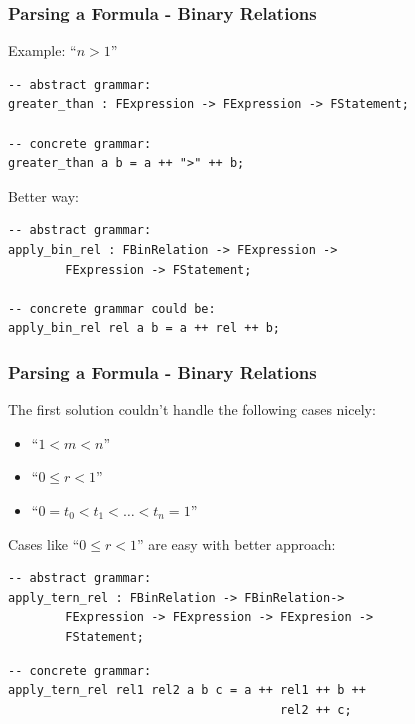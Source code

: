 \documentclass[usenames,dvipsnames,handout]{beamer}
\def\strf#1{``\emph{#1}''}   %
\begin{document}

\begin{frame}[fragile]
    \frametitle{Parsing a Formula - Binary Relations}
    Example: \strf{$n > 1$}

    \begin{lstlisting}[language=GF]
-- abstract grammar:
greater_than : FExpression -> FExpression -> FStatement;

-- concrete grammar:
greater_than a b = a ++ ">" ++ b;
    \end{lstlisting}

    \vspace{0.5em}

    \pause
    Better way:
    \begin{lstlisting}[language=GF]
-- abstract grammar:
apply_bin_rel : FBinRelation -> FExpression ->
        FExpression -> FStatement;

-- concrete grammar could be:
apply_bin_rel rel a b = a ++ rel ++ b;
    \end{lstlisting}
\end{frame}

\begin{frame}[fragile]
    \frametitle{Parsing a Formula - Binary Relations}
    The first solution couldn't handle the following cases nicely:
    \begin{itemize}
        \item \strf{$1 < m < n$}
        \item \strf{$0 \le r < 1$}
        \item \strf{$0 = t_0 < t_1 < \ldots < t_n = 1$}
    \end{itemize}
    
    \vspace{1.5em}

    \pause
    Cases like \strf{$0 \le r < 1$} are easy with better approach:
    \begin{lstlisting}[language=GF]
-- abstract grammar:
apply_tern_rel : FBinRelation -> FBinRelation->
        FExpression -> FExpression -> FExpresion ->
        FStatement;
    \end{lstlisting}
    \begin{lstlisting}[language=GF]
-- concrete grammar:
apply_tern_rel rel1 rel2 a b c = a ++ rel1 ++ b ++
                                      rel2 ++ c;
    \end{lstlisting}
\end{frame}
\end{document}
